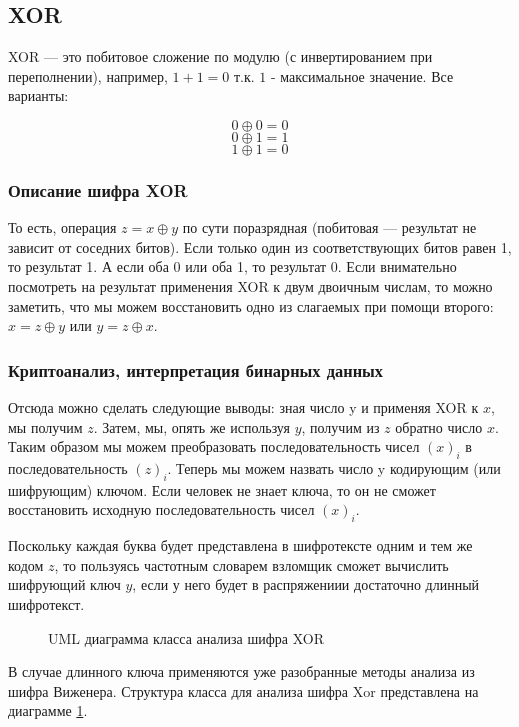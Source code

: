 \subsection{XOR}

XOR --- это побитовое сложение по модулю 
(с инвертированием при переполнении), 
например, $1+1=0$ т.к. $1$ - максимальное значение. Все варианты:

$$0 \oplus 0=0$$
$$0 \oplus 1=1$$
$$1 \oplus 1=0$$

\subsubsection{Описание шифра XOR}

То есть, операция $z = x \oplus y$ по сути поразрядная (побитовая — 
результат не зависит от соседних битов). Если только один из 
соответствующих битов равен 1, то результат 1. А если оба 0 или 
оба 1, то результат 0. Если внимательно посмотреть на результат 
применения XOR к двум двоичным числам, то можно заметить, что 
мы можем восстановить одно из слагаемых при помощи второго: $x 
= z \oplus y$ или $y = z \oplus x$. 

\subsubsection{Криптоанализ, интерпретация бинарных данных}

Отсюда можно сделать следующие выводы: зная число y и применяя 
XOR к $x$, мы получим $z$. Затем, мы, опять же используя $y$, получим 
из $z$ обратно число $x$. Таким образом мы можем преобразовать последовательность 
чисел $(x)_i$ в последовательность $(z)_i$. Теперь мы можем назвать 
число y кодирующим (или шифрующим) ключом. Если человек не знает 
ключа, то он не сможет восстановить исходную последовательность 
чисел $(x)_i$.

Поскольку каждая буква будет представлена в шифротексте 
одним и тем же кодом $z$, то пользуясь частотным словарем взломщик 
сможет вычислить шифрующий ключ $y$, если у него будет в распряжениии 
достаточно длинный шифротекст. 
\begin{figure}[H]
\noindent{}
\caption{UML диаграмма класса анализа шифра XOR}
\label{uml_xor}
\end{figure}

В случае длинного ключа применяются уже разобранные методы 
анализа из шифра Виженера. 
Структура класса для анализа шифра Xor
представлена на диаграмме \ref{uml_xor}.
